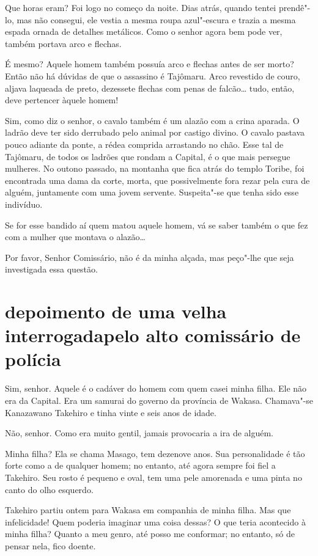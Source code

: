 Que horas eram? Foi logo no começo da noite. Dias atrás, quando tentei
prendê"-lo, mas não consegui, ele vestia a mesma roupa azul"-escura e
trazia a mesma espada ornada de detalhes metálicos. Como o senhor agora
bem pode ver, também portava arco e flechas.

É mesmo? Aquele homem também possuía arco e flechas antes de ser morto?
Então não há dúvidas de que o assassino é Tajômaru. Arco revestido de
couro, aljava laqueada de preto, dezessete flechas com penas de
falcão\ldots{} tudo, então, deve pertencer àquele homem!

Sim, como diz o senhor, o cavalo também é um alazão com a crina aparada.
O ladrão deve ter sido derrubado pelo animal por castigo divino. O
cavalo pastava pouco adiante da ponte, a rédea comprida arrastando no
chão. Esse tal de Tajômaru, de todos os ladrões que rondam a Capital, é
o que mais persegue mulheres. No outono passado, na montanha que fica
atrás do templo Toribe, foi encontrada uma dama da corte, morta, que
possivelmente fora rezar pela cura de alguém, juntamente com uma jovem
servente. Suspeita"-se que tenha sido esse indivíduo.

Se for esse bandido aí quem matou aquele homem, vá se saber também o que
fez com a mulher que montava o alazão…

Por favor, Senhor Comissário, não é da minha alçada, mas peço"-lhe que
seja investigada essa questão.

\section*{depoimento de uma velha interrogada\break pelo alto comissário de polícia}

Sim, senhor. Aquele é o cadáver do homem com quem casei minha filha. Ele
não era da Capital. Era um samurai do governo da província de Wakasa.
Chamava"-se Kanazawano Takehiro e tinha vinte e seis anos de idade.

Não, senhor. Como era muito gentil, jamais provocaria a ira de alguém.

Minha filha? Ela se chama Masago, tem dezenove anos. Sua personalidade é
tão forte como a de qualquer homem; no entanto, até agora sempre foi
fiel a Takehiro. Seu rosto é pequeno e oval, tem uma pele amorenada e
uma pinta no canto do olho esquerdo.

Takehiro partiu ontem para Wakasa em companhia de minha filha. Mas que
infelicidade! Quem poderia imaginar uma coisa dessas? O que teria
acontecido à minha filha? Quanto a meu genro, até posso me conformar;
no entanto, só de pensar nela, fico doente.

